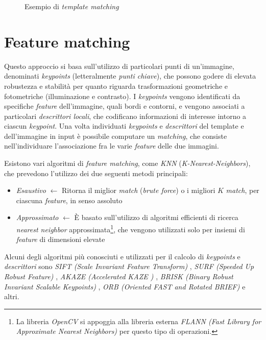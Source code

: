 \begin{figure}[H]
{{{			}
		}
	}
	\caption{Esempio di \textit{template matching}} \label{fig:template-matching}
\end{figure}

\section{Feature matching}
\label{sec:feature-matching}
Questo approccio si basa sull'utilizzo di particolari punti di un'immagine, denominati \textit{keypoints} (letteralmente \textit{punti chiave}), che possono godere di elevata robustezza e stabilit\`a per quanto riguarda trasformazioni geometriche e fotometriche (illuminazione e contrasto). I \textit{keypoints} vengono identificati da specifiche \textit{feature} dell'immagine, quali bordi e contorni, e vengono associati a particolari \textit{descrittori locali}, che codificano informazioni di interesse intorno a ciascun \textit{keypoint}. Una volta individuati \textit{keypoints} e \textit{descrittori} del template e dell'immagine in input \`e possibile computare un \textit{matching}, che consiste nell'individuare l'associazione fra le varie \textit{feature} delle due immagini.\par
Esistono vari algoritmi di \textit{feature matching}, come \textit{KNN} (\textit{K-Nearest-Neighbors}), che prevedono l'utilizzo dei due seguenti metodi principali:
\begin{itemize}
	\item \textit{Esaustivo} $\gets$ Ritorna il miglior \textit{match} (\textit{brute force}) o i migliori $K$ \textit{match}, per ciascuna \textit{feature}, in senso assoluto
	\item \textit{Approssimato} $\gets$ \`E basato sull'utilizzo di algoritmi efficienti di ricerca \textit{nearest neighbor} approssimata\footnote{La libreria \textit{OpenCV} si appoggia alla libreria esterna \textit{FLANN (Fast Library for Approximate Nearest Neighbors)} per questo tipo di operazioni.}, che vengono utilizzati solo per insiemi di \textit{feature} di dimensioni elevate 
\end{itemize}\par
Alcuni degli algoritmi pi\`u conosciuti e utilizzati per il calcolo di \textit{keypoints} e \textit{descrittori} sono \textit{SIFT (Scale Invariant Feature Transform)} \cite{bib:sift}, \textit{SURF (Speeded Up Robust Feature)} \cite{bib:surf}, \textit{AKAZE (Accelerated KAZE \cite{bib:kaze})} \cite{bib:akaze}, \textit{BRISK (Binary Robust Invariant Scalable Keypoints)} \cite{bib:brisk}, \textit{ORB (Oriented FAST and Rotated BRIEF)} \cite{bib:orb} e altri.\par
